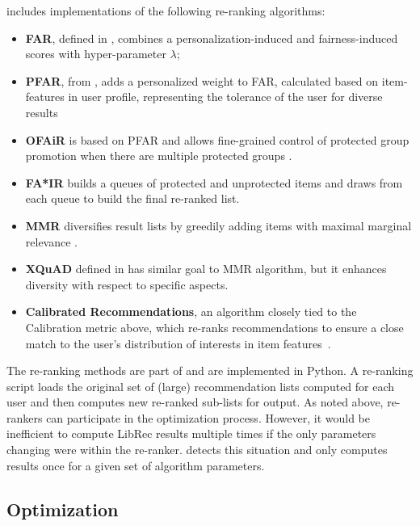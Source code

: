 \libauto{} includes implementations of the following re-ranking algorithms:
\begin{itemize}
    \item \textbf{FAR}, defined in \cite{liu2019farpfar}, combines a personalization-induced and fairness-induced scores with hyper-parameter $\lambda$;
    \item \textbf{PFAR}, from \cite{liu2019farpfar}, adds a personalized weight to FAR, calculated based on item-features in user profile, representing the tolerance of the user for diverse results
    \item \textbf{OFAiR} is based on PFAR and allows fine-grained control of protected group promotion when there are multiple protected groups \cite{sonboli2020opportunistic}.
    \item \textbf{FA*IR} \cite{zehlike2017fa} builds a queues of protected and unprotected items and draws from each queue to build the final re-ranked list.
    \item \textbf{MMR} diversifies result lists by greedily adding items with maximal marginal relevance \cite{carbonell1998use}.
    \item \textbf{XQuAD} defined in \cite{santos2010explicit} has similar goal to MMR algorithm, but it enhances diversity with respect to specific aspects.
    \item \textbf{Calibrated Recommendations}, an algorithm closely tied to the Calibration metric above, which re-ranks recommendations to ensure a close match to the user's distribution of interests in item features~\cite{steck2018calibrated}.
\end{itemize}

The re-ranking methods are part of \libauto{} and are implemented in Python. A re-ranking script loads the original set of (large) recommendation lists computed for each user and then computes new re-ranked sub-lists for output. As noted above, re-rankers can participate in the optimization process. However, it would be inefficient to compute LibRec results multiple times if the only parameters changing were within the re-ranker. \libauto{} detects this situation and only computes results once for a given set of algorithm parameters. 


\subsection{Optimization}
\label{sec:opt}

